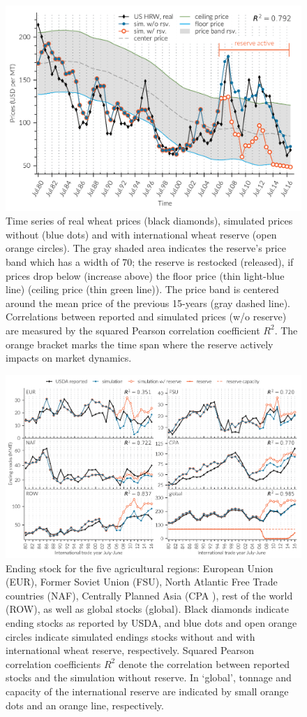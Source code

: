\documentclass[12pt]{article}
\begin{document}
\begin{figure}[htbp]
  \centering
\includegraphics[width=.8\textwidth]{plots/full/pric1980_2017}
\caption{Time series of real wheat prices (black diamonds), simulated prices without (blue dots) and with international wheat reserve (open orange circles). The gray shaded area indicates the reserve's price band which has a width of 70\USD; the reserve is restocked (released), if prices drop below (increase above) the floor price (thin light-blue line) (ceiling price (thin green line)). The price band is centered around the mean price of the previous 15-years (gray dashed line). Correlations between reported and simulated prices (w/o reserve) are measured by the squared Pearson correlation coefficient $R^2$. The orange bracket marks the time span where the reserve actively impacts on market dynamics.}
\label{fig:Fig1}
\end{figure}
\begin{figure}[htbp]
  \centering
\includegraphics[width=.8\textwidth]{plots/full/Ending_stocks__MMT__1980_2017}
\caption{Ending stock for the five agricultural regions: European Union (EUR), Former Soviet Union (FSU), North Atlantic Free Trade countries (NAF), Centrally Planned Asia (CPA ), rest of the world (ROW), as well as global stocks (global). Black diamonds indicate ending stocks as reported by USDA, and blue dots and open orange circles indicate simulated endings stocks without and with international wheat reserve, respectively. Squared Pearson correlation coefficients $R^2$ denote the correlation between reported stocks and the simulation without reserve. In `global', tonnage and capacity of the international reserve are indicated by small orange dots and an orange line, respectively.}
  \label{fig:Fig2}
\end{figure}
\end{document}
